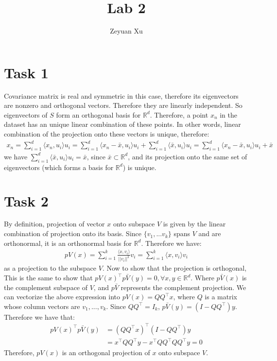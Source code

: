 \documentclass[11pt]{article}
\theoremstyle{plain}
\theoremstyle{definition}
\begin{document}
 
\title{Lab 2}
\author{Zeyuan Xu}
\maketitle
\section{Task 1}
Covariance matrix is real and symmetric in this case, therefore its eigenvectors are nonzero and orthogonal vectors. Therefore they are linearly independent. So eigenvectors of $S$ form an orthogonal basis for $\mathbb{R}^d$. Therefore, a point $x_n$ in the dataset has an unique linear combination of these points. In other words, linear combination of the projection onto these vectors is unique, therefore: \begin{align*}
x_n = \sum\limits_{i=1}^{d} \langle x_n , u_i\rangle u_i  = \sum\limits_{i=1}^{d} \langle x_n - \bar{x} , u_i  \rangle u_i + \sum\limits_{i=1}^{d} \langle \bar{x} , u_i \rangle u_i = \sum\limits_{i=1}^{d} \langle x_n - \bar{x} , u_i  \rangle u_i + \bar{x}
\end{align*}
we have $\sum\limits_{i=1}^{d} \langle \bar{x} , u_i \rangle u_i = \bar{x}$,  since $\bar{x} \subset \mathbb{R}^d$, and its projection onto the same set of eigenvectors (which forms a basis for $\mathbb{R}^d$) is unique.

\section{Task 2}
By definition, projection of vector $x$ onto subspace $V$ is given by the linear combination of projection onto its basis. Since $\{ v_1, ... v_k \}$ spans $V$ and are orthonormal, it is an orthonormal basis for $\mathbb{R}^d$. Therefore we have: \begin{align*}
pV(x) = \sum\limits_{i=1}^{k} \frac{\langle x, v_i \rangle}{||v_i||^2} v_i = \sum\limits_{i=1}^{k} \langle  x, v_i \rangle v_i 
\end{align*}
as a projection to the subspace $V$. Now to show that the projection is orthogonal, This is the same to show that $pV(x)^\top p\bar{V}(y) = 0, \forall x,y \in \mathbb{R}^d$. Where $p\bar{V} (x)$ is the complement subspace of $V$, and $p\bar{V}$ represents the complement projection. We can vectorize the above expression into $pV(x) = QQ^\top x$, where $Q$ is a matrix whose column vectors are $v_1, ..., v_k$. Since $QQ^\top = I_k$, $p\bar{V}(y) = (I - QQ^\top)y$. Therefore we have that: \begin{align*}
pV(x)^\top p\bar{V}(y) &= (QQ^\top x)^\top (I-QQ^\top)y \\
&= x^\top QQ^\top y- x^\top QQ^\top QQ^\top y = 0
\end{align*}
Therefore, $pV(x)$ is an orthogonal projection of $x$ onto subspace $V$. 
\end{document}
